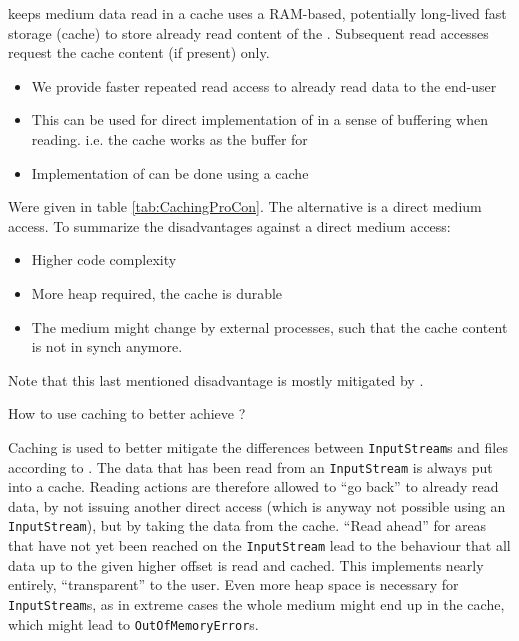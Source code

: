 {%
\COMPmedia{} keeps medium data read in a cache
}
{%
\COMPmedia{} uses a RAM-based, potentially long-lived fast storage (cache) to store already read content of the \TERMmedium{}. Subsequent read accesses request the cache content (if present) only.
}
{%
\begin{itemize}
\item We provide faster repeated read access to already read data to the end-user
\item This can be used for direct implementation of  in a sense of buffering when reading. i.e. the cache works as the buffer for 
\item Implementation of  can be done using a cache
\end{itemize}
}
{%
Were given in table \hyperref[tab:CachingProCon]{\ref{tab:CachingProCon}}. The alternative is a direct medium access. To summarize the disadvantages against a direct medium access:
\begin{itemize}
\item Higher code complexity
\item More heap required, the cache is durable
\item The medium might change by external processes, such that the cache content is not in synch anymore.
\end{itemize}
Note that this last mentioned disadvantage is mostly mitigated by .
}

How to use caching to better achieve ?

{%
Caching is used to better mitigate the differences between \texttt{InputStream}s and files according to .
}
{%
The data that has been read from an \texttt{InputStream} is always put into a cache. Reading actions are therefore allowed to ``go back'' to already read data, by not issuing another direct access (which is anyway not possible using an \texttt{InputStream}), but by taking the data from the cache. ``Read ahead'' for areas that have not yet been reached on the \texttt{InputStream} lead to the behaviour that all data up to the given higher offset is read and cached.
}
{%
This implements  nearly entirely, ``transparent'' to the user.
}
{%
Even more heap space is necessary for \texttt{InputStream}s, as in extreme cases the whole medium might end up in the cache, which might lead to \texttt{OutOfMemoryError}s.
}

